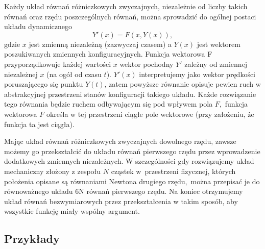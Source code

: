 
\indent
Każdy układ równań różniczkowych zwyczajnych, niezależnie od liczby takich równań oraz rzędu poszczególnych równań, można sprowadzić do ogólnej postaci układu dynamicznego $$Y'(x)=F(x,Y(x)),$$ gdzie $x$ jest zmienną niezależną (zazwyczaj czasem) a $Y(x)$ jest wektorem poszukiwanych zmiennych konfiguracyjnych. Funkcja wektorowa F przyporządkowuje każdej wartości $x$ wektor pochodny $Y'$ zależny od zmiennej niezależnej $x$ (na ogół od czasu $t$). $Y'(x)$ interpretujemy jako wektor prędkości poruszającego się punktu $Y(t)$, zatem powyższe równanie opisuje pewien ruch w abstrakcyjnej przestrzeni  stanów konfiguracji takiego układu. Każde rozwiązanie tego równania będzie ruchem odbywającym się pod wpływem pola $F$,~fun\-kcja wektorowa $F$ określa w tej przestrzeni ciągłe pole wektorowe (przy założeniu, że funkcja ta jest ciągła). 

Mając układ  równań różniczkowych zwyczajnych dowolnego rzędu, zawsze możemy go przekształcić do układu równań pierwszego rzędu przez wprowadzenie dodatkowych zmiennych niezależnych. W szczególności 
gdy rozwiązujemy układ mechaniczny złożony z zespołu $N$ cząstek w~przestrzeni fizycznej, których położenia opisane są równaniami Newtona drugiego rzędu,~można przepisać je do równoważnego układu 6N równań pierwszego rzędu. Na koniec otrzymujemy układ równań bezwymiarowych przez przekształcenia w takim sposób, aby wszystkie funkcję miały wspólny argument.

\subsection{Przykłady}

